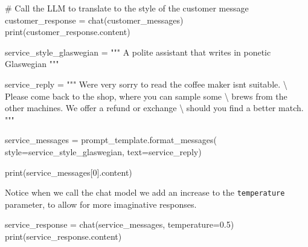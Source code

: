 \documentclass[
  letterpaper,
  DIV=11,
  numbers=noendperiod]{scrreprt}
\newenvironment{Shaded}{\begin{snugshade}}{\end{snugshade}}
\newcommand{\BuiltInTok}[1]{\textcolor[rgb]{0.00,0.23,0.31}{#1}}
\newcommand{\CharTok}[1]{\textcolor[rgb]{0.13,0.47,0.30}{#1}}
\newcommand{\CommentTok}[1]{\textcolor[rgb]{0.37,0.37,0.37}{#1}}
\newcommand{\DecValTok}[1]{\textcolor[rgb]{0.68,0.00,0.00}{#1}}
\newcommand{\FloatTok}[1]{\textcolor[rgb]{0.68,0.00,0.00}{#1}}
\newcommand{\NormalTok}[1]{\textcolor[rgb]{0.00,0.23,0.31}{#1}}
\newcommand{\OperatorTok}[1]{\textcolor[rgb]{0.37,0.37,0.37}{#1}}
\newcommand{\StringTok}[1]{\textcolor[rgb]{0.13,0.47,0.30}{#1}}
\begin{document}
\begin{Shaded}
\begin{Highlighting}[]
\CommentTok{\# Call the LLM to translate to the style of the customer message}
\NormalTok{customer\_response }\OperatorTok{=}\NormalTok{ chat(customer\_messages)}
\BuiltInTok{print}\NormalTok{(customer\_response.content)}
\end{Highlighting}
\end{Shaded}

\begin{Shaded}
\begin{Highlighting}[]
\NormalTok{service\_style\_glaswegian }\OperatorTok{=} \StringTok{"""}
\StringTok{A polite assistant that writes in ponetic Glaswegian}
\StringTok{"""}
\end{Highlighting}
\end{Shaded}

\begin{Shaded}
\begin{Highlighting}[]
\NormalTok{service\_reply }\OperatorTok{=} \StringTok{"""}
\StringTok{We\textquotesingle{}re very sorry to read the coffee maker isn\textquotesingle{}t suitable. }\CharTok{\textbackslash{}}
\StringTok{Please come back to the shop, where you can sample some }\CharTok{\textbackslash{}}
\StringTok{brews from the other machines. We offer a refund or exchange }\CharTok{\textbackslash{}}
\StringTok{should you find a better match.}
\StringTok{"""}
\end{Highlighting}
\end{Shaded}

\begin{Shaded}
\begin{Highlighting}[]
\NormalTok{service\_messages }\OperatorTok{=}\NormalTok{ prompt\_template.format\_messages(}
\NormalTok{    style}\OperatorTok{=}\NormalTok{service\_style\_glaswegian,}
\NormalTok{    text}\OperatorTok{=}\NormalTok{service\_reply)}

\BuiltInTok{print}\NormalTok{(service\_messages[}\DecValTok{0}\NormalTok{].content)}
\end{Highlighting}
\end{Shaded}

Notice when we call the chat model we add an increase to the
\texttt{temperature} parameter, to allow for more imaginative responses.

\begin{Shaded}
\begin{Highlighting}[]
\NormalTok{service\_response }\OperatorTok{=}\NormalTok{ chat(service\_messages, temperature}\OperatorTok{=}\FloatTok{0.5}\NormalTok{)}
\BuiltInTok{print}\NormalTok{(service\_response.content)}
\end{Highlighting}
\end{Shaded}
\end{document}
